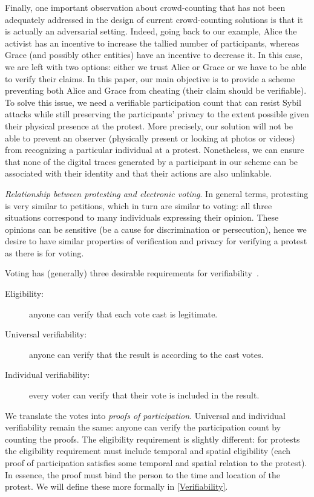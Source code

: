 Finally, one important observation about crowd-counting that has not been adequately addressed in the design of current crowd-counting solutions is that it is actually an adversarial setting. 
Indeed, going back to our example, Alice the activist has an incentive to increase the tallied number of participants, whereas Grace (and possibly other entities) have an incentive to decrease it.
In this case, we are left with two options: either we trust Alice or Grace or we have to be able to verify their claims.
In this paper, our main objective is to provide a scheme preventing both Alice and Grace from cheating (\ie their claim should be verifiable).
To solve this issue, we need a verifiable participation count that can resist Sybil attacks while still preserving the participants'
privacy to the extent possible given their physical presence at the protest. 
More precisely, our solution will not be able to prevent an observer (physically present or looking at photos or videos) from recognizing a particular individual at a protest. 
Nonetheless, we can ensure that none of the digital traces generated by a participant in our scheme can be associated with their identity and that their actions are also unlinkable.

\emph{Relationship between protesting and electronic voting}. In general terms, protesting is very similar to petitions, which in turn are similar to voting: all three situations correspond to many individuals expressing their opinion.
These opinions can be sensitive (\eg be a cause for discrimination or persecution), hence we desire to have similar properties of verification and privacy for verifying a protest as there is for voting.

Voting has (generally) three desirable requirements for verifiability~\cite{VerifyingPrivacyPropertiesOfVotingProtocols}.
\begin{description}
  \item[Eligibility:] anyone can verify that each vote cast is legitimate.
  \item[Universal verifiability:] anyone can verify that the result is according 
    to the cast votes.
  \item[Individual verifiability:] every voter can verify that their vote is 
    included in the result.
\end{description}
We translate the votes into \emph{proofs of participation}.
Universal and individual verifiability remain the same: anyone can verify the participation count by counting the proofs.
The eligibility requirement is slightly different: for protests the eligibility requirement must include temporal and spatial 
eligibility (\ie each proof of participation satisfies some temporal and spatial relation to the protest).
In essence, the proof must bind the person to the time and location of the protest.
We will define these more formally in \cref{Verifiability}.


